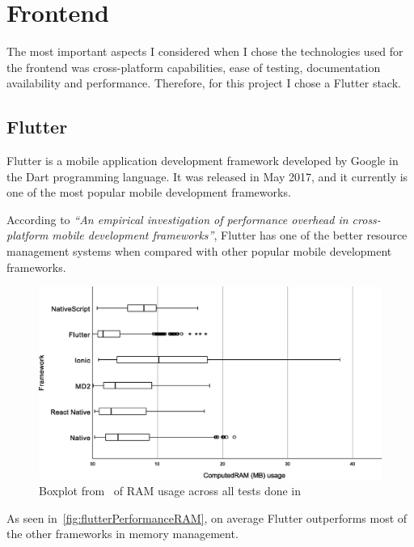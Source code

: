 \documentclass[a4paper,12pt]{report}
\begin{document}
\section{Frontend}

The most important aspects I considered when I chose the technologies used for
the frontend was cross-platform capabilities, ease of testing, documentation
availability and performance. Therefore, for this project I chose a Flutter
stack.

\subsection{Flutter}

Flutter\cite{flutterDocs} is a mobile application development framework
developed by Google in the Dart programming language. It was released in May
2017, and it currently is one of the most popular mobile development
frameworks.

According to \textit{``An empirical investigation of performance overhead in
    cross-platform mobile development frameworks''}\cite{flutterPerformance},
Flutter has one of the better resource management systems when compared with
other popular mobile development frameworks.

\begin{figure}[H]
    \centering
    \includegraphics[scale=0.4]{images/flutterPerformance/ram.png}
    \caption{Boxplot from~\cite{flutterPerformance} of RAM usage across all tests done in~\cite{flutterPerformance} }\label{fig:flutterPerformanceRAM}
\end{figure}

As seen in~\autoref{fig:flutterPerformanceRAM}, on average Flutter outperforms
most of the other frameworks in memory management.
\end{document}
